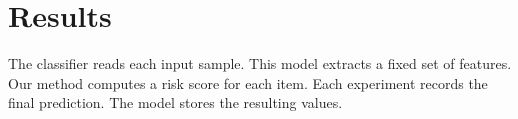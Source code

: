\section{Results}
The classifier reads each input sample. This model extracts a fixed set of features. Our method computes a risk score for each item. Each experiment records the final prediction. The model stores the resulting values.
